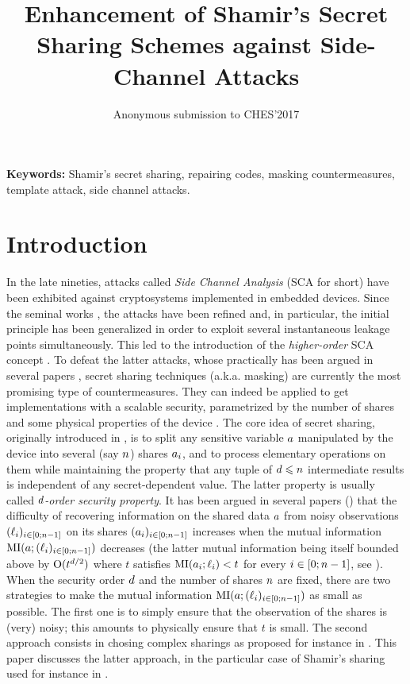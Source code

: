 \documentclass{llncs}
\title{Enhancement of Shamir's Secret Sharing Schemes against Side-Channel Attacks}
\author{Anonymous submission to CHES'2017}
\institute{}
\begin{document}
\maketitle
\begin{abstract}
 \todo{}
\end{abstract}
{\bf Keywords:} Shamir's secret sharing, repairing codes, masking countermeasures, template attack, side channel attacks.
 

\section{Introduction}
\label{sec-intro}

In the late nineties, attacks called {\em Side Channel Analysis} (SCA for short) have been exhibited against cryptosystems implemented in embedded devices. Since the seminal works \cite{Koc96,KJJ99}, the attacks have been refined and, in particular, the initial principle has been generalized in order to exploit several instantaneous leakage points simultaneously. This led to the introduction of the {\em higher-order} SCA concept \cite{Mes00a}. To defeat the latter attacks, whose practically has been argued in several papers \cite{OMHT06,SVOGMKM10a,LPR13}, secret sharing techniques (a.k.a. masking) are currently the most promising type of countermeasures. They can indeed be applied to get implementations with a scalable security, parametrized by the number of shares and some physical properties of the device \cite{CJRR99a,PR13}. The core idea of secret sharing, originally introduced in \cite{Sha79}, is to split any sensitive variable $a$ manipulated by the device into several (say $n$) shares $a_{i}$, and to process elementary operations on them while maintaining the property that any tuple of $d \leqslant n$ intermediate results is independent of
any secret-dependent value. The latter property is usually called {\em $d$\th-order security property}. It has been argued in several papers (\eg \cite{DDF14,DFS15,GHR15,SVOGMKM10}) that the difficulty of recovering information on the shared data $a$ from noisy observations $(\ell_{i})_{i\in [0;n-1]}$ on its shares $(a_{i})_{i\in [0;n-1]}$ increases when the mutual information $\mathrm{MI}(a;(\ell_{i})_{i\in [0;n -1]})$ decreases (the latter mutual information being itself bounded above by $\mathrm{O}(t^{d/2})$ where $t$ satisfies $\mathrm{MI}(a_{i};\ell_{i})<t$ for every $i\in [0;n -1]$, see \cite{DFS15}). When the security order $d$ and the number of shares $n$ are fixed, there are two strategies to make the mutual information $\mathrm{MI}(a;(\ell_{i})_{i\in [0;n -1]})$ as small as possible. The first one is to simply ensure that the observation of the shares is (very) noisy; this amounts to physically ensure that $t$ is small. The second approach consists in chosing complex sharings as proposed for instance in \cite{BFG15,FMPR10,PR11,RP12,WSYPJGG16}. This paper discusses the latter approach, in the particular case of Shamir's sharing used for instance in \cite{GM11,GSF13,PR11,RP12}.
\end{document}
